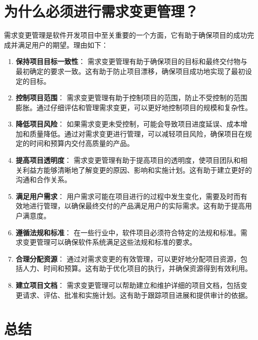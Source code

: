 \documentclass[11pt, a4paper, oneside]{ctexbook}
\begin{document}
\chapter{为什么必须进行需求变更管理？}
需求变更管理是软件开发项目中至关重要的一个方面，它有助于确保项目的成功完成并满足用户的期望。理由如下：
\begin{enumerate}
    \item {\bfseries\kaishu 保持项目目标一致性}： 需求变更管理有助于确保项目的目标和最终交付物与最初确定的要求一致。这有助于防止项目漂移，确保项目成功地实现了最初设定的目标。
    \item {\bfseries\kaishu 控制项目范围}： 需求变更管理有助于控制项目的范围，防止不受控制的范围膨胀。通过仔细评估和管理需求变更，可以更好地控制项目的规模和复杂性。
    \item {\bfseries\kaishu 降低项目风险}： 如果需求变更未受控制，可能会导致项目进度延误、成本增加和质量降低。通过对需求变更进行管理，可以减轻项目风险，确保项目在规定的时间和预算内交付高质量的产品。
    \item {\bfseries\kaishu 提高项目透明度}： 需求变更管理有助于提高项目的透明度，使项目团队和相关利益方能够清晰地了解变更的原因、影响和实施计划。这有助于建立更好的沟通和合作关系。
    \item {\bfseries\kaishu 满足用户需求}： 用户需求可能在项目进行的过程中发生变化，需要及时而有效地进行管理，以确保最终交付的产品满足用户的实际需求。这有助于提高用户满意度。
    \item {\bfseries\kaishu 遵循法规和标准}： 在一些行业中，软件项目必须符合特定的法规和标准。需求变更管理可以确保软件系统满足这些法规和标准的要求。
    \item {\bfseries\kaishu 合理分配资源}： 通过对需求变更的有效管理，可以更好地分配项目资源，包括人力、时间和预算。这有助于优化项目的执行，并确保资源得到有效利用。
    \item {\bfseries\kaishu 建立项目文档}： 需求变更管理可以帮助建立和维护详细的项目文档，包括变更请求、评估、批准和实施计划。这有助于跟踪项目进展和提供审计的依据。
\end{enumerate}

\chapter{总结}
\end{document}
